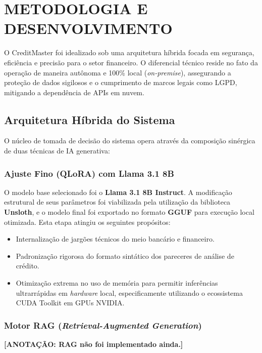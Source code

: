 \chapter{METODOLOGIA E DESENVOLVIMENTO}

O CreditMaster foi idealizado sob uma arquitetura híbrida focada em segurança, eficiência e precisão para o setor financeiro. O diferencial técnico reside no fato da operação de maneira autônoma e 100\% local (\textit{on-premise}), assegurando a proteção de dados sigilosos e o cumprimento de marcos legais como LGPD, mitigando a dependência de APIs em nuvem.

\section{Arquitetura Híbrida do Sistema}
O núcleo de tomada de decisão do sistema opera através da composição sinérgica de duas técnicas de IA generativa:

\subsection{Ajuste Fino (QLoRA) com Llama 3.1 8B}
O modelo base selecionado foi o \textbf{Llama 3.1 8B Instruct}. A modificação estrutural de seus parâmetros foi viabilizada pela utilização da biblioteca \textbf{Unsloth}, e o modelo final foi exportado no formato \textbf{GGUF} para execução local otimizada. 
Esta etapa atingiu os seguintes propósitos:
\begin{itemize}
    \item Internalização de jargões técnicos do meio bancário e financeiro.
    \item Padronização rigorosa do formato sintático dos pareceres de análise de crédito.
    \item Otimização extrema no uso de memória para permitir inferências ultrarrápidas em \textit{hardware} local, especificamente utilizando o ecossistema CUDA Toolkit em GPUs NVIDIA.
\end{itemize}

\subsection{Motor RAG (\textit{Retrieval-Augmented Generation})}
\textbf{[ANOTAÇÃO: RAG não foi implementado ainda.]}

